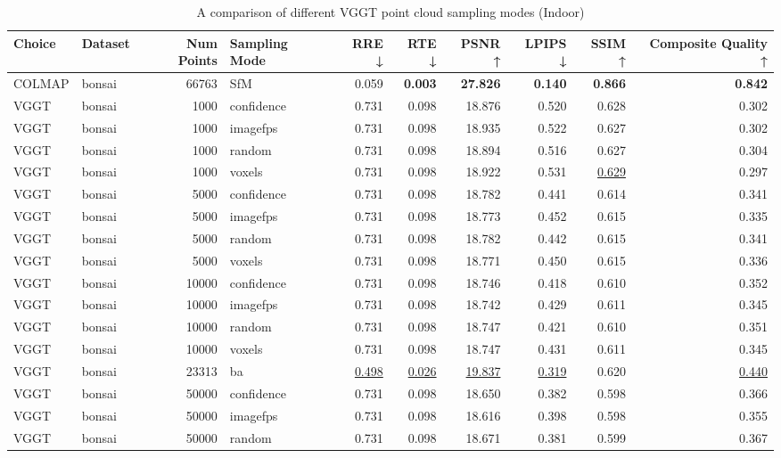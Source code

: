 \begin{table}[H]
\caption{\ifdefined\customcaption \customcaption \else A comparison of different VGGT point cloud sampling modes (Indoor) \fi}
\label{tab:03_sampling_mode_indoor}
\centering
\tiny
\begin{tabular}{llrlrrrrrr}
\toprule
Choice & Dataset & Num Points & Sampling Mode & RRE ↓ & RTE ↓ & PSNR ↑ & LPIPS ↓ & SSIM ↑ & Composite Quality ↑ \\
\midrule
COLMAP & bonsai & 66763 & SfM & 0.059 & \textbf{0.003} & \textbf{27.826} & \textbf{0.140} & \textbf{0.866} & \textbf{0.842} \\
VGGT & bonsai & 1000 & confidence & 0.731 & 0.098 & 18.876 & 0.520 & 0.628 & 0.302 \\
VGGT & bonsai & 1000 & imagefps & 0.731 & 0.098 & 18.935 & 0.522 & 0.627 & 0.302 \\
VGGT & bonsai & 1000 & random & 0.731 & 0.098 & 18.894 & 0.516 & 0.627 & 0.304 \\
VGGT & bonsai & 1000 & voxels & 0.731 & 0.098 & 18.922 & 0.531 & \underline{0.629} & 0.297 \\
VGGT & bonsai & 5000 & confidence & 0.731 & 0.098 & 18.782 & 0.441 & 0.614 & 0.341 \\
VGGT & bonsai & 5000 & imagefps & 0.731 & 0.098 & 18.773 & 0.452 & 0.615 & 0.335 \\
VGGT & bonsai & 5000 & random & 0.731 & 0.098 & 18.782 & 0.442 & 0.615 & 0.341 \\
VGGT & bonsai & 5000 & voxels & 0.731 & 0.098 & 18.771 & 0.450 & 0.615 & 0.336 \\
VGGT & bonsai & 10000 & confidence & 0.731 & 0.098 & 18.746 & 0.418 & 0.610 & 0.352 \\
VGGT & bonsai & 10000 & imagefps & 0.731 & 0.098 & 18.742 & 0.429 & 0.611 & 0.345 \\
VGGT & bonsai & 10000 & random & 0.731 & 0.098 & 18.747 & 0.421 & 0.610 & 0.351 \\
VGGT & bonsai & 10000 & voxels & 0.731 & 0.098 & 18.747 & 0.431 & 0.611 & 0.345 \\
VGGT & bonsai & 23313 & ba & \underline{0.498} & \underline{0.026} & \underline{19.837} & \underline{0.319} & 0.620 & \underline{0.440} \\
VGGT & bonsai & 50000 & confidence & 0.731 & 0.098 & 18.650 & 0.382 & 0.598 & 0.366 \\
VGGT & bonsai & 50000 & imagefps & 0.731 & 0.098 & 18.616 & 0.398 & 0.598 & 0.355 \\
VGGT & bonsai & 50000 & random & 0.731 & 0.098 & 18.671 & 0.381 & 0.599 & 0.367 \\

\end{tabular}
\end{table}
